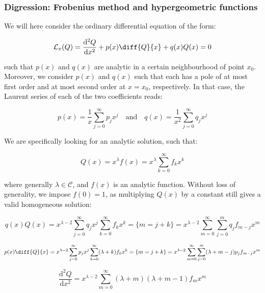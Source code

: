 \subsubsection{Digression: Frobenius method and hypergeometric functions}

We will here consider the ordinary differential equation of the form:

\begin{equation}
    \label{eq-digg-hypergeom-1}
    \mathcal{L}_x(Q)=\frac{\mathrm{d}^2Q}{\mathrm{d}x^2}+p(x)\diff{Q}{x}+q(x)Q(x)=0
\end{equation}

such that $p(x)$ and $q(x)$ are analytic in a certain neighbourhood of point $x_0$. Moreover, we consider $p(x)$ and $q(x)$ such that each has a pole of at most first order and at most second order at $x=x_0$, respectively. In that case, the Laurent series of each of the two coefficients reads:

\begin{equation}
    p(x)=\frac{1}{x}\sum_{j=0}^\infty p_jx^j\quad\text{and}\quad q(x)=\frac{1}{x^2}\sum_{j=0}^\infty q_jx^j
\end{equation}

We are specifically looking for an analytic solution, such that:

\begin{equation}
    Q(x)=x^\lambda f(x)=x^\lambda\sum_{k=0}^\infty f_kx^k
\end{equation}

where generally $\lambda\in\mathcal{C}$, and $f(x)$ is an analytic function. Without loss of generality, we impose $f(0)=1$, as multiplying $Q(x)$ by a constant still gives a valid homogeneous solution:

\begin{equation}
    q(x)Q(x)=x^{\lambda-2}\sum_{j=0}^\infty q_jx^j\sum_{k=0}^\infty f_kx^k=\{m=j+k\}=x^{\lambda-2}\sum_{m=0}^\infty\sum_{j=0}^mq_jf_{m-j}x^m
\end{equation}

\begin{equation}
    p(x)\diff{Q}{x}=x^{\lambda-2}\sum_{j=0}^\infty p_jx^j\sum_{k=0}^\infty(\lambda+k)f_kx^k=\{m=j+k\}=x^{\lambda-2}\sum_{m=0}^\infty\sum_{j=0}^m(\lambda+m-j)p_jf_{m-j}x^m
\end{equation}

\begin{equation}
    \frac{\mathrm{d}^2Q}{\mathrm{d}x^2}=x^{\lambda-2}\sum_{m=0}^\infty(\lambda+m)(\lambda+m-1)f_{m}x^m
\end{equation}

